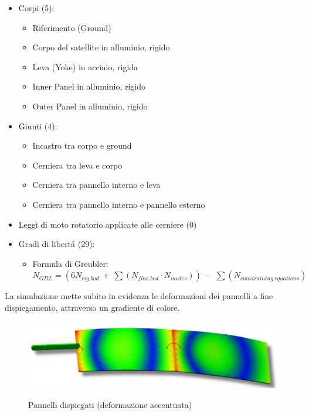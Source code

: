 \documentclass{article}
\begin{document}
        \begin{itemize}
            \item Corpi (5):
            \begin{itemize}
                \item Riferimento (Ground) 
                \item Corpo del satellite in alluminio, rigido
                \item Leva (Yoke) in acciaio, rigida
                \item Inner Panel in alluminio, rigido
                \item Outer Panel in alluminio, rigido
            \end{itemize}
            \item Giunti (4):
            \begin{itemize}
                \item Incastro tra corpo e ground
                \item Cerniera tra leva e corpo
                \item Cerniera tra pannello interno e leva
                \item Cerniera tra pannello interno e pannello esterno
            \end{itemize}
            \item Leggi di moto rotatorio applicate alle cerniere (0)
            \item Gradi di libertá (29):
            \begin{itemize}
                \item Formula di Greubler: \\ 
                $N_{GDL} = (6N_{rig.bod} \ + \ \sum (N_{flex.bod} \cdot N_{modes})) \ - \ \sum (N_{constraining \ equations}) $
            \end{itemize}
        \end{itemize}

        La simulazione mette subito in evidenza le deformazioni dei pannelli a fine dispiegamento, 
        attraverso un gradiente di colore.

            \begin{figure}[h!]
                 \label{fig:pannello_deformato}
                \includegraphics[width=\textwidth]{MUL2/Esercitazione4/pannello_flesso.png}
                \caption{Pannelli dispiegati (deformazione accentuata)}
            \end{figure}
\end{document}
